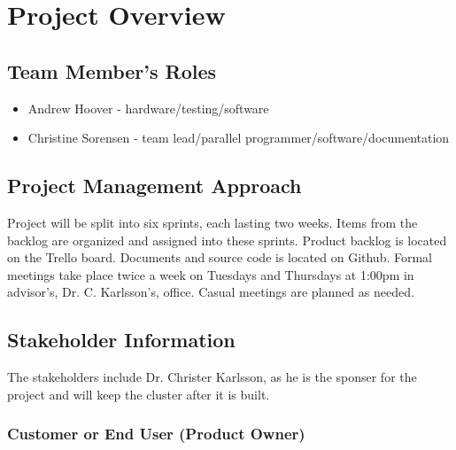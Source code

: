 

\chapter{Project Overview}



\section{Team Member's Roles}
\begin{itemize}
	\item Andrew Hoover - hardware/testing/software 
	\item Christine Sorensen - team lead/parallel programmer/software/documentation
\end{itemize}

\section{Project  Management Approach}
Project will be split into six sprints, each lasting two weeks. Items from the backlog are organized and assigned into these sprints. \newline \newline Product backlog is located on the Trello board. Documents and source code is located on Github. \newline \newline Formal meetings take place twice a week on Tuesdays and Thursdays at 1:00pm in advisor's, Dr. C. Karlsson's, office. Casual meetings are planned as needed.


\section{ Stakeholder Information}


The stakeholders include Dr. Christer Karlsson, as he is the sponser for the project and will keep the cluster after it is built. 


\subsection{Customer or End User (Product Owner)}

